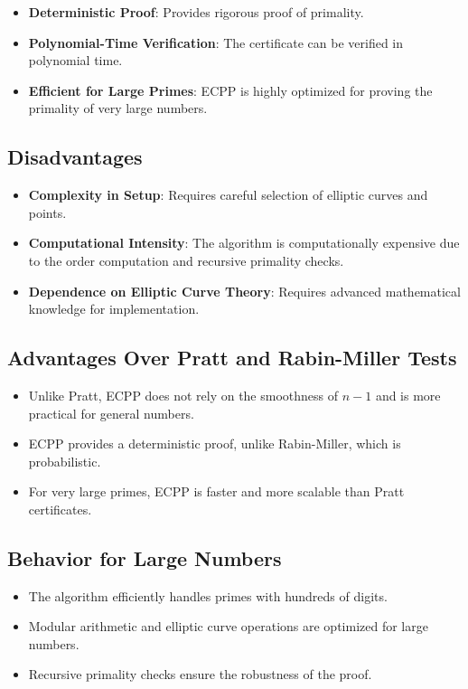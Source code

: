 \documentclass[12pt]{article}
\begin{document}
\begin{itemize}
    \item \textbf{Deterministic Proof}: Provides rigorous proof of primality.
    \item \textbf{Polynomial-Time Verification}: The certificate can be verified in polynomial time.
    \item \textbf{Efficient for Large Primes}: ECPP is highly optimized for proving the primality of very large numbers.
\end{itemize}

\subsection*{Disadvantages}

\begin{itemize}
    \item \textbf{Complexity in Setup}: Requires careful selection of elliptic curves and points.
    \item \textbf{Computational Intensity}: The algorithm is computationally expensive due to the order computation and recursive primality checks.
    \item \textbf{Dependence on Elliptic Curve Theory}: Requires advanced mathematical knowledge for implementation.
\end{itemize}

\subsection*{Advantages Over Pratt and Rabin-Miller Tests}

\begin{itemize}
    \item Unlike Pratt, ECPP does not rely on the smoothness of \( n - 1 \) and is more practical for general numbers.
    \item ECPP provides a deterministic proof, unlike Rabin-Miller, which is probabilistic.
    \item For very large primes, ECPP is faster and more scalable than Pratt certificates.
\end{itemize}

\subsection*{Behavior for Large Numbers}

\begin{itemize}
    \item The algorithm efficiently handles primes with hundreds of digits.
    \item Modular arithmetic and elliptic curve operations are optimized for large numbers.
    \item Recursive primality checks ensure the robustness of the proof.
\end{itemize}
\end{document}
